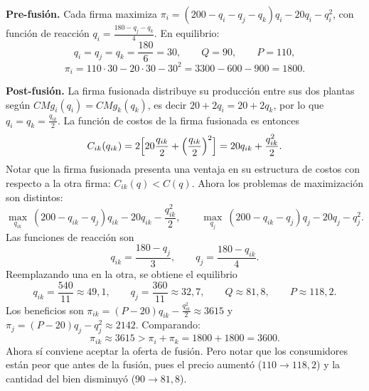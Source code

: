 \begin{parts}
\begin{solution}
\textbf{Pre-fusión.} Cada firma maximiza $\pi_i = (200 - q_i - q_j - q_k)q_i - 20q_i - q_i^2$, con función de reacción $q_i = \frac{180 - q_j - q_k}{4}$. En equilibrio:
\[
  q_i = q_j = q_k = \frac{180}{6} = 30, \qquad Q = 90, \qquad P = 110,
\]
\[
  \pi_i = 110\cdot 30 - 20\cdot 30 - 30^2 = 3300 - 600 - 900 = 1800 .
\]

\textbf{Post-fusión.} La firma fusionada distribuye su producción entre sus dos plantas según $CMg_i(q_i) = CMg_k(q_k)$, es decir $20 + 2q_i = 20 + 2q_k$, por lo que $q_i = q_k = \frac{q_{ik}}{2}$. La función de costos de la firma fusionada es entonces
\[
  C_{ik}(q_{ik}) = 2\Bigl[20\frac{q_{ik}}{2} + \Bigl(\frac{q_{ik}}{2}\Bigr)^2\Bigr] = 20q_{ik} + \frac{q_{ik}^2}{2}.
\]
Notar que la firma fusionada presenta una ventaja en su estructura de costos con respecto a la otra firma: $C_{ik}(q) < C(q)$. Ahora los problemas de maximización son distintos:
\[
  \max_{q_{ik}}\ (200 - q_{ik} - q_j)q_{ik} - 20q_{ik} - \frac{q_{ik}^2}{2}, \qquad
  \max_{q_j}\ (200 - q_{ik} - q_j)q_j - 20q_j - q_j^2 .
\]
Las funciones de reacción son
\[
  q_{ik} = \frac{180 - q_j}{3}, \qquad q_j = \frac{180 - q_{ik}}{4}.
\]
Reemplazando una en la otra, se obtiene el equilibrio
\[
  q_{ik} = \frac{540}{11} \approx 49{,}1, \qquad q_j = \frac{360}{11} \approx 32{,}7, \qquad Q \approx 81{,}8, \qquad P \approx 118{,}2 .
\]
Los beneficios son $\pi_{ik} = (P-20)q_{ik} - \frac{q_{ik}^2}{2} \approx 3615$ y $\pi_j = (P-20)q_j - q_j^2 \approx 2142$. Comparando:
\[
  \pi_{ik} \approx 3615 > \pi_i + \pi_k = 1800 + 1800 = 3600 .
\]
Ahora sí conviene aceptar la oferta de fusión. Pero notar que los consumidores están peor que antes de la fusión, pues el precio aumentó ($110 \to 118{,}2$) y la cantidad del bien disminuyó ($90 \to 81{,}8$).

\end{solution}
\end{parts}

